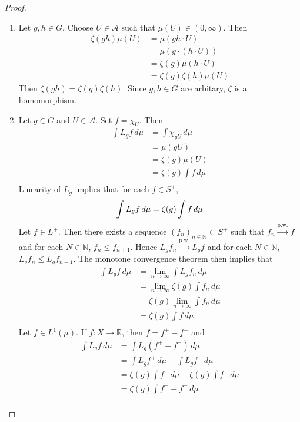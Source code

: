 \documentclass[12pt]{amsart}
\theoremstyle{definition}
\newcommand{\N}{\mathbb{N}}
\newcommand{\R}{\mathbb{R}}
\newcommand{\MA}{\mathcal{A}}
\newcommand{\dmu}{\, d \mu}
\newcommand{\limn}{\lim \limits_{n \rightarrow \infty}}
\newcommand{\convt}[1]{\xrightarrow{\text{#1}}}
\begin{document}
	\begin{proof}\
		\begin{enumerate}
			\item Let $g,h \in G$. Choose $U \in \MA$ such that $\mu(U) \in (0, \infty)$. Then 
			\begin{align*}
				\zeta(gh) \mu(U)
				&= \mu(gh \cdot U) \\
				&= \mu(g \cdot (h \cdot U)) \\
				&= \zeta(g) \mu(h \cdot U) \\
				&= \zeta(g) \zeta(h) \mu(U)
			\end{align*}
			Then $\zeta(gh) = \zeta(g) \zeta(h)$. Since $g, h \in G$ are arbitary, $\zeta$ is a homomorphism.
			\item Let $g \in G$ and $U \in \MA$. Set $f = \chi_U$. Then 
			\begin{align*}
				\int L_g f \dmu
				&= \int \chi_{gU} \dmu \\
				&= \mu(gU) \\
				&= \zeta(g) \mu(U) \\
				&= \zeta(g) \int f \dmu \\
			\end{align*} 
			Linearity of $L_g$ implies that for each $f \in S^+$, 
			$$\int L_g f \dmu = \zeta(g) \int f \dmu \\$$
			Let $f \in L^+$. Then there exists a sequence $(f_n)_{n \in \N} \subset S^+$ such that $f_n \convt{p.w.} f$ and for each $N \in \N$, $f_n \leq f_{n+1}$. Hence $L_g f_n \convt{p.w.} L_gf$ and for each $N \in \N$, $L_g f_n \leq L_g f_{n+1}$. The monotone convergence theorem then implies that 
			\begin{align*}
				\int L_g f \dmu
				&= \limn \int L_g f_n \dmu \\
				&= \limn \zeta(g) \int f_n \dmu \\ 
				&= \zeta(g) \limn \int f_n \dmu \\ 
				&= \zeta(g) \int f \dmu \\
			\end{align*} 
		Let $f \in L^1(\mu)$. If $f:X \rightarrow \R$, then $f = f^+ - f^-$ and 
		\begin{align*}
			\int L_g f \dmu
			&= \int L_g(f^+ - f^-) \dmu \\
			&= \int L_g f^+ \dmu - \int L_g f^- \dmu \\
			&= \zeta(g) \int f^+ \dmu - \zeta(g) \int f^- \dmu \\
			&= \zeta(g) \int f^+  -  f^- \dmu \\

\end{align*}
\end{enumerate}
\end{proof}
\end{document}
